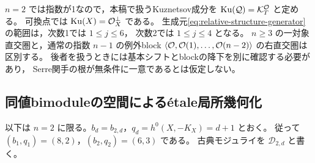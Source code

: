 \begin{remark}[曲面と高次元での名称]
\label{rem:structure-orthogonal-surface}
$n=2$ では指数が1なので，本稿で扱うKuznetsov成分を
$\operatorname{Ku}(\mathcal Q)=\mathcal K_T^{\mathcal O}$ と定める。
可換点では $\operatorname{Ku}(X)=\mathcal O_X^\perp$ である。
生成元\eqref{eq:relative-structure-generator}の範囲は，次数1では $1\le j\le6$，
次数2では $1\le j\le4$ となる。
$n\ge3$ の一対象直交圏と，通常の指数 $n-1$ の例外block
$\langle\mathcal O,\mathcal O(1),\ldots,\mathcal O(n-2)\rangle$ の右直交圏は区別する。
後者を扱うときには基本シフトとblockの降下を別に確認する必要があり，
Serre関手の根が無条件に一意であるとは仮定しない。
\end{remark}

\subsection{同値bimoduleの空間による\'{e}tale局所幾何化}

以下は $n=2$ に限る。$b_d=b_{2,d}$，$q_d=h^0(X,-K_X)=d+1$ とおく。
従って $(b_1,q_1)=(8,2)$，$(b_2,q_2)=(6,3)$ である。
古典モジュライを $\mathcal D_{2,d}$ と書く。

